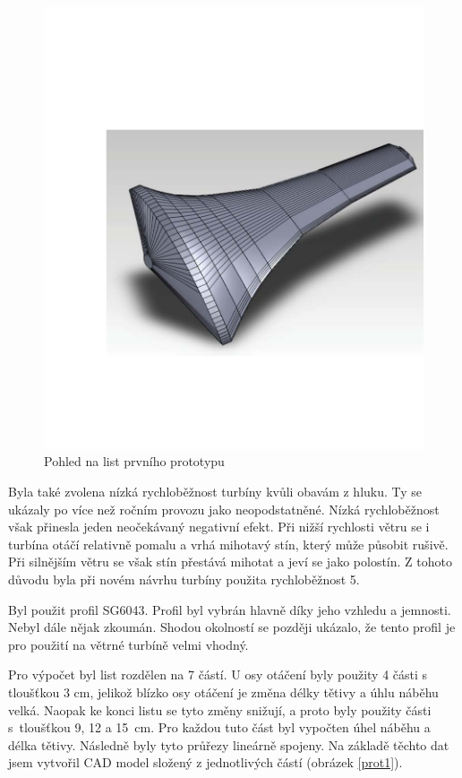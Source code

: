 \begin{figure}[H]
	\centering
	\includegraphics[]{obrazky/prot2p}
	\caption{Pohled na list prvního prototypu}
	\label{prot2}
\end{figure}


Byla také zvolena nízká rychloběžnost turbíny kvůli obavám z hluku. Ty se ukázaly po více než ročním provozu jako neopodstatněné. Nízká rychloběžnost však přinesla jeden neočekávaný negativní efekt. Při nižší rychlosti větru se i turbína otáčí relativně pomalu a vrhá mihotavý stín, který může působit rušivě. Při silnějším větru se však stín přestává mihotat a jeví se jako polostín. Z tohoto důvodu byla při novém návrhu turbíny použita rychloběžnost 5.


Byl použit profil SG6043. Profil byl vybrán hlavně díky jeho vzhledu a jemnosti. Nebyl dále nějak zkoumán. Shodou okolností se později ukázalo, že tento profil je pro použití na větrné turbíně velmi vhodný.

Pro výpočet byl list rozdělen na 7 částí. U osy otáčení byly použity 4 části s tloušťkou 3 cm, jelikož blízko osy otáčení je změna délky tětivy a úhlu náběhu velká. Naopak ke konci listu se tyto změny snižují, a proto byly použity části s~tloušťkou 9, 12 a 15~cm. Pro každou tuto část byl vypočten úhel náběhu a délka tětivy. Následně byly tyto průřezy lineárně spojeny. Na základě těchto dat jsem vytvořil CAD model složený z jednotlivých částí (obrázek \ref{prot1}).

